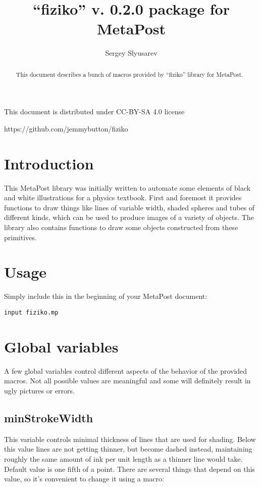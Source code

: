 \documentclass{article}
\author{Sergey Slyusarev}
\title{``fiziko'' v. 0.2.0 package for MetaPost}
\begin{document}
\maketitle

\begin{abstract}
This document describes a bunch of macros provided by ``fiziko'' library for MetaPost.
\end{abstract}

\begin{centering}

This document is distributed under CC-BY-SA 4.0 license 

\cc\bysa

https://github.com/jemmybutton/fiziko

\end{centering}

\section{Introduction}
This MetaPost library was initially written to automate some elements of black and white illustrations for a physics textbook. First and foremost it provides functions to draw things like lines of variable width, shaded spheres and tubes of different kinds, which can be used to produce images of a variety of objects. The library also contains functions to draw some objects constructed from these primitives.

\section{Usage}
Simply include this in the beginning of your MetaPost document:

\begin{lstlisting}
input fiziko.mp
\end{lstlisting}

\section{Global variables}
A few global variables control different aspects of the behavior of the provided macros. Not all possible values are meaningful and some will definitely result in ugly pictures or errors.

\subsection{minStrokeWidth}
This variable controls minimal thickness of lines that are used for shading. Below this value lines are not getting thinner, but become dashed instead, maintaining roughly the same amount of ink per unit length as a thinner line would take. Default value is one fifth of a point. There are several things that depend on this value, so it's convenient to change it using a macro:
\end{document}
